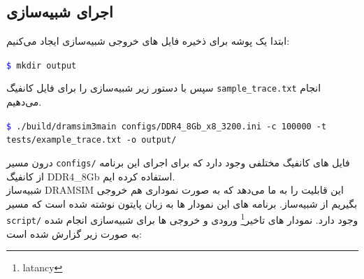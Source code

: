 \documentclass[12pt]{exam}
\begin{document}
\begin{questions}
\subsection{اجرای شبیه‌سازی}
ابتدا یک پوشه برای ذخیره فایل های خروجی شبیه‌سازی ایجاد می‌کنیم: \\

\begin{latin}
	\texttt{\textcolor{blue}{\$} mkdir output} \\
\end{latin}


سپس با دستور زیر شبیه‌سازی را برای فایل کانفیگ \texttt{sample\_trace.txt} انجام می‌دهیم.

\begin{latin}
	\texttt{\textcolor{blue}{\$} ./build/dramsim3main configs/DDR4\_8Gb\_x8\_3200.ini -c 100000 -t}\\ 
	\texttt{tests/example\_trace.txt -o output/} \\
\end{latin}


درون مسیر \texttt{configs/} فایل های کانفیگ مختلفی وجود دارد که برای اجرای این برنامه از کانفیگ DDR4\_8Gb استفاده کرده ایم. \\

شبیه‌ساز DRAMSIM این قابلیت را به ما می‌دهد که به صورت نموداری هم خروجی بگیریم از شبیه‌ساز. برنامه های این نمودار ها به زبان پایتون نوشته شده است که مسیر \texttt{script/} وجود دارد. نمودار های تاخیر\footnote{latancy} ورودی و خروجی ها برای شبیه‌سازی انجام شده به صورت زیر گزارش شده است:








\end{questions}
\end{document}
